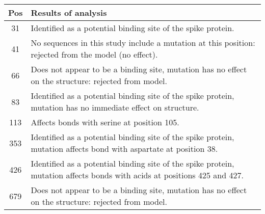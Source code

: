 \begin{table}[ht]
  \centering
  \begin{tabular}[t]{ c | p{28em} }
    \hline
    \textbf{Pos} & \textbf{Results of analysis} \\
    \hline
    31 & Identified as a potential binding site of the spike protein. \\
    41 & No sequences in this study include a mutation at this position: rejected from the model (no effect). \\
    66 & Does not appear to be a binding site, mutation has no effect on the structure: rejected from model. \\
    83 & Identified as a potential binding site of the spike protein, mutation has no immediate effect on structure. \\
    113 & Affects bonds with serine at position 105. \\ 
    353 & Identified as a potential binding site of the spike protein, mutation affects bond with aspartate at position 38. \\
    426 & Identified as a potential binding site of the spike protein, mutation affects bonds with acids at positions 425 and 427. \\
    679 & Does not appear to be a binding site, mutation has no effect on the structure: rejected from model. \\
    \hline
  \end{tabular}
\end{table}

